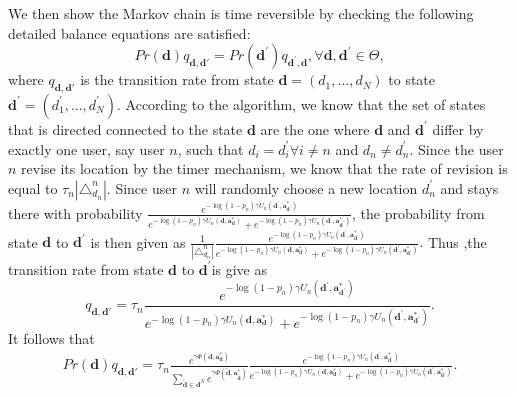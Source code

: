 We then show the Markov chain is time reversible by checking the following
detailed balance equations are satisfied:\begin{equation}
Pr(\boldsymbol{d})q_{\boldsymbol{d},\boldsymbol{d}'}=Pr(\boldsymbol{d}^{'})q_{\boldsymbol{d}^{'},\boldsymbol{d}},\forall \boldsymbol{d},\boldsymbol{d}^{'}\in\Theta,\label{eq:sd11}\end{equation}
where $q_{\boldsymbol{d},\boldsymbol{d}'}$ is the transition rate from state $\boldsymbol{d}=(d_{1},...,d_{N})$
to state $\boldsymbol{d}^{'}=(d_{1}^{'},...,d_{N}^{'})$. According to the algorithm,
we know that the set of states that is directed connected to the state
$\boldsymbol{d}$ are the one where $\boldsymbol{d}$ and $\boldsymbol{d}^{'}$ differ by exactly one user,
say user $n$, such that $d_{i}=d_{i}^{'}\forall i\neq n$ and $d_{n}\neq d_{n}^{'}$.
Since the user $n$ revise its location by the timer mechanism, we
know that the rate of revision is equal to $\tau_{n}|\mathcal{\triangle}_{d_{n}}^{n}|$.
Since user $n$ will randomly choose a new location $d_{n}^{'}$ and
stays there with probability $\frac{e^{-\log(1-p_{n})\gamma U_{n}(\boldsymbol{d}^{'},\boldsymbol{a}_{\boldsymbol{d}^{'}}^{*})}}{e^{-\log(1-p_{n})\gamma U_{n}(\boldsymbol{d},\boldsymbol{a}_{\boldsymbol{d}}^{*})}+e^{-\log(1-p_{n})\gamma U_{n}(\boldsymbol{d}^{'},\boldsymbol{a}_{\boldsymbol{d}^{'}}^{*})}}$,
the probability from state $\boldsymbol{d}$ to $\boldsymbol{d}^{'}$ is then given as $\frac{1}{|\mathcal{\triangle}_{d_{n}}^{n}|}\frac{e^{-\log(1-p_{n})\gamma U_{n}(\boldsymbol{d}^{'},\boldsymbol{a}_{\boldsymbol{d}^{'}}^{*})}}{e^{-\log(1-p_{n})\gamma U_{n}(\boldsymbol{d},\boldsymbol{a}_{\boldsymbol{d}}^{*})}+e^{-\log(1-p_{n})\gamma U_{n}(\boldsymbol{d}^{'},\boldsymbol{a}_{\boldsymbol{d}^{'}}^{*})}}.$
Thus ,the transition rate from state $\boldsymbol{d}$ to $\boldsymbol{d}^{'}$is give as \begin{equation}
q_{\boldsymbol{d},\boldsymbol{d}'}=\tau_{n}\frac{e^{-\log(1-p_{n})\gamma U_{n}(\boldsymbol{d}^{'},\boldsymbol{a}_{\boldsymbol{d}^{'}}^{*})}}{e^{-\log(1-p_{n})\gamma U_{n}(\boldsymbol{d},\boldsymbol{a}_{\boldsymbol{d}}^{*})}+e^{-\log(1-p_{n})\gamma U_{n}(\boldsymbol{d}^{'},\boldsymbol{a}_{\boldsymbol{d}^{'}}^{*})}}.\label{eq:sd12}\end{equation}
It follows that\begin{align}
 Pr(\boldsymbol{d})q_{\boldsymbol{d},\boldsymbol{d}'}= \tau_{n}\frac{e^{\gamma\Phi(\boldsymbol{d},\boldsymbol{a}_{\boldsymbol{d}}^{*})}}{\sum_{\tilde{\boldsymbol{d}}\in\mathcal{\boldsymbol{d}}^{N}}e^{\gamma\Phi(\tilde{\boldsymbol{d}},\boldsymbol{a}_{\tilde{\boldsymbol{d}}}^{*})}}\frac{e^{-\log(1-p_{n})\gamma U_{n}(\boldsymbol{d}^{'},\boldsymbol{a}_{\boldsymbol{d}^{'}}^{*})}}{e^{-\log(1-p_{n})\gamma U_{n}(\boldsymbol{d},\boldsymbol{a}_{\boldsymbol{d}}^{*})}+e^{-\log(1-p_{n})\gamma U_{n}(\boldsymbol{d}^{'},\boldsymbol{a}_{\boldsymbol{d}^{'}}^{*})}}.\label{eq:sd13} \end{align}

